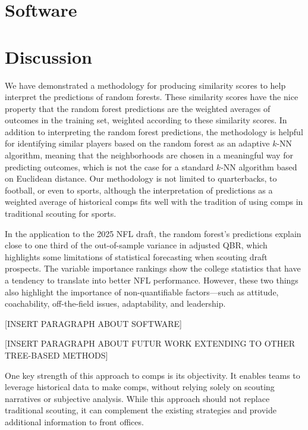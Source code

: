 \documentclass{article}
\begin{document}
\section{Software}
\label{sec:software}

\section{Discussion}
\label{sec:discussion}

We have demonstrated a methodology for producing similarity scores to help interpret the predictions of random forests. These similarity scores have the nice property that the random forest predictions are the weighted averages of outcomes in the training set, weighted according to these similarity scores. In addition to interpreting the random forest predictions, the methodology is helpful for identifying similar players based on the random forest as an adaptive $k$-NN algorithm, meaning that the neighborhoods are chosen in a meaningful way for predicting outcomes, which is not the case for a standard $k$-NN algorithm based on Euclidean distance. Our methodology is not limited to quarterbacks, to football, or even to sports, although the interpretation of predictions as a weighted average of historical comps fits well with the tradition of using comps in traditional scouting for sports.

In the application to the 2025 NFL draft, the random forest's predictions explain close to one third of the out-of-sample variance in adjusted QBR, which highlights some limitations of statistical forecasting when scouting draft prospects. The variable importance rankings show the college statistics that have a tendency to translate into better NFL performance. However, these two things also highlight the importance of non-quantifiable factors---such as attitude, coachability, off-the-field issues, adaptability, and leadership.

[INSERT PARAGRAPH ABOUT SOFTWARE]

[INSERT PARAGRAPH ABOUT FUTUR WORK EXTENDING TO OTHER TREE-BASED METHODS]

One key strength of this approach to comps is its objectivity. It enables teams to leverage historical data to make comps, without relying solely on scouting narratives or subjective analysis. While this approach should not replace traditional scouting, it can complement the existing strategies and provide additional information to front offices. 

\printbibliography
\end{document}
